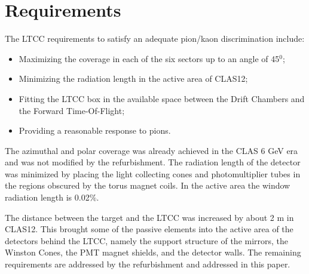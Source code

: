 \section{Requirements}


The LTCC requirements to satisfy an adequate pion/kaon discrimination include:


\begin{itemize}
	\item Maximizing the coverage in each of the six sectors up to an angle of 45$^0$;
	\item Minimizing the radiation length in the active area of CLAS12;
	\item Fitting the LTCC box in the available space between the Drift Chambers and the Forward Time-Of-Flight;
	\item Providing a reasonable response to pions.
\end{itemize}

The azimuthal and polar coverage was already achieved in the CLAS 6 GeV era and was not modified by the refurbishment.
The radiation length of the detector was minimized by placing the light collecting cones and photomultiplier tubes
in the regions obscured by the torus magnet coils. In the active area the window radiation length is 0.02$\%$.

The distance between the target and the LTCC was increased by about 2 m in CLAS12. This brought some of the passive
elements into the active area of the detectors behind the LTCC, namely the support structure of the mirrors, the Winston
Cones, the PMT magnet shields, and the detector walls.
The remaining requirements are addressed by the refurbishment and addressed in this paper.
